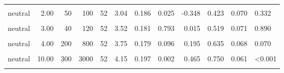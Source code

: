 \documentclass[
]{article}
\begin{document}
\begin{longtable}[t]{lrrrrrrlrrrl}
\hspace{1em}\cellcolor{gray!10}{neutral} & \cellcolor{gray!10}{2.00} & \cellcolor{gray!10}{20} & \cellcolor{gray!10}{40} & \cellcolor{gray!10}{19} & \cellcolor{gray!10}{3.53} & \cellcolor{gray!10}{0.318} & \cellcolor{gray!10}{0.984} & \cellcolor{gray!10}{0.020} & \cellcolor{gray!10}{0.474} & \cellcolor{gray!10}{0.121} & \cellcolor{gray!10}{>0.999}\\
\hspace{1em}neutral & 2.00 & 50 & 100 & 52 & 3.04 & 0.186 & 0.025 & -0.348 & 0.423 & 0.070 & 0.332\\
\hspace{1em}\cellcolor{gray!10}{neutral} & \cellcolor{gray!10}{3.00} & \cellcolor{gray!10}{10} & \cellcolor{gray!10}{30} & \cellcolor{gray!10}{19} & \cellcolor{gray!10}{3.37} & \cellcolor{gray!10}{0.238} & \cellcolor{gray!10}{0.512} & \cellcolor{gray!10}{-0.130} & \cellcolor{gray!10}{0.474} & \cellcolor{gray!10}{0.121} & \cellcolor{gray!10}{>0.999}\\
\hspace{1em}neutral & 3.00 & 40 & 120 & 52 & 3.52 & 0.181 & 0.793 & 0.015 & 0.519 & 0.071 & 0.890\\
\hspace{1em}\cellcolor{gray!10}{neutral} & \cellcolor{gray!10}{4.00} & \cellcolor{gray!10}{20} & \cellcolor{gray!10}{80} & \cellcolor{gray!10}{19} & \cellcolor{gray!10}{3.79} & \cellcolor{gray!10}{0.310} & \cellcolor{gray!10}{0.397} & \cellcolor{gray!10}{0.220} & \cellcolor{gray!10}{0.526} & \cellcolor{gray!10}{0.121} & \cellcolor{gray!10}{>0.999}\\
\hspace{1em}neutral & 4.00 & 200 & 800 & 52 & 3.75 & 0.179 & 0.096 & 0.195 & 0.635 & 0.068 & 0.070\\
\hspace{1em}\cellcolor{gray!10}{neutral} & \cellcolor{gray!10}{10.00} & \cellcolor{gray!10}{40} & \cellcolor{gray!10}{400} & \cellcolor{gray!10}{19} & \cellcolor{gray!10}{4.32} & \cellcolor{gray!10}{0.236} & \cellcolor{gray!10}{0.004} & \cellcolor{gray!10}{0.813} & \cellcolor{gray!10}{0.842} & \cellcolor{gray!10}{0.088} & \cellcolor{gray!10}{0.004}\\
\hspace{1em}neutral & 10.00 & 300 & 3000 & 52 & 4.15 & 0.197 & 0.002 & 0.465 & 0.750 & 0.061 & <0.001\\
\hspace{1em}\cellcolor{gray!10}{neutral} & \cellcolor{gray!10}{15.00} & \cellcolor{gray!10}{20} & \cellcolor{gray!10}{300} & \cellcolor{gray!10}{52} & \cellcolor{gray!10}{3.98} & \cellcolor{gray!10}{0.207} & \cellcolor{gray!10}{0.020} & \cellcolor{gray!10}{0.326} & \cellcolor{gray!10}{0.731} & \cellcolor{gray!10}{0.063} & \cellcolor{gray!10}{0.001}\\

\end{longtable}
\end{document}
